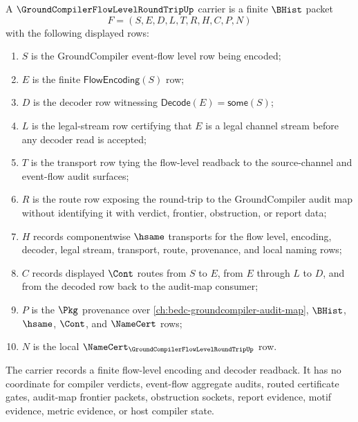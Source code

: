 \begin{definition}
\label{def:groundcompiler-flow-level-round-trip-carrier}
A $\GroundCompilerFlowLevelRoundTripUp$ carrier is a finite $\BHist$ packet
$$
F=(S,E,D,L,T,R,H,C,P,N)
$$
with the following displayed rows:
\begin{enumerate}
\item $S$ is the GroundCompiler event-flow level row being encoded;
\item $E$ is the finite $\mathsf{FlowEncoding}(S)$ row;
\item $D$ is the decoder row witnessing $\mathsf{Decode}(E)=\mathsf{some}(S)$;
\item $L$ is the legal-stream row certifying that $E$ is a legal channel stream before any decoder read is accepted;
\item $T$ is the transport row tying the flow-level readback to the source-channel and event-flow audit surfaces;
\item $R$ is the route row exposing the round-trip to the GroundCompiler audit map without identifying it with verdict, frontier, obstruction, or report data;
\item $H$ records componentwise $\hsame$ transports for the flow level, encoding, decoder, legal stream, transport, route, provenance, and local naming rows;
\item $C$ records displayed $\Cont$ routes from $S$ to $E$, from $E$ through $L$ to $D$, and from the decoded row back to the audit-map consumer;
\item $P$ is the $\Pkg$ provenance over \autoref{ch:bedc-groundcompiler-audit-map}, $\BHist$, $\hsame$, $\Cont$, and $\NameCert$ rows;
\item $N$ is the local $\NameCert_{\GroundCompilerFlowLevelRoundTripUp}$ row.
\end{enumerate}
The carrier records a finite flow-level encoding and decoder readback. It has no coordinate for compiler verdicts, event-flow aggregate audits, routed certificate gates, audit-map frontier packets, obstruction sockets, report evidence, motif evidence, metric evidence, or host compiler state.
\end{definition}

